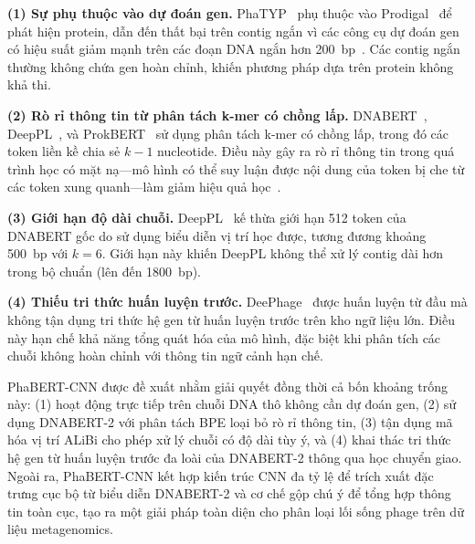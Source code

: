\textbf{(1) Sự phụ thuộc vào dự đoán gen.} PhaTYP~\cite{shang2023phatyp} phụ thuộc vào Prodigal~\cite{hyatt2010prodigal} để phát hiện protein, dẫn đến thất bại trên contig ngắn vì các công cụ dự đoán gen có hiệu suất giảm mạnh trên các đoạn DNA ngắn hơn 200~bp~\cite{trimble2012short}. Các contig ngắn thường không chứa gen hoàn chỉnh, khiến phương pháp dựa trên protein không khả thi.

\textbf{(2) Rò rỉ thông tin từ phân tách k-mer có chồng lấp.} DNABERT~\cite{ji2021dnabert}, DeepPL~\cite{zhang2024deeppl}, và ProkBERT~\cite{ligeti2024prokbert} sử dụng phân tách k-mer có chồng lấp, trong đó các token liền kề chia sẻ $k-1$ nucleotide. Điều này gây ra rò rỉ thông tin trong quá trình học có mặt nạ---mô hình có thể suy luận được nội dung của token bị che từ các token xung quanh---làm giảm hiệu quả học~\cite{zhou2023dnabert}.

\textbf{(3) Giới hạn độ dài chuỗi.} DeepPL~\cite{zhang2024deeppl} kế thừa giới hạn 512 token của DNABERT gốc do sử dụng biểu diễn vị trí học được, tương đương khoảng 500~bp với $k=6$. Giới hạn này khiến DeepPL không thể xử lý contig dài hơn trong bộ chuẩn (lên đến 1800~bp).

\textbf{(4) Thiếu tri thức huấn luyện trước.} DeePhage~\cite{wu2021deephage} được huấn luyện từ đầu mà không tận dụng tri thức hệ gen từ huấn luyện trước trên kho ngữ liệu lớn. Điều này hạn chế khả năng tổng quát hóa của mô hình, đặc biệt khi phân tích các chuỗi không hoàn chỉnh với thông tin ngữ cảnh hạn chế.

PhaBERT-CNN được đề xuất nhằm giải quyết đồng thời cả bốn khoảng trống này: (1) hoạt động trực tiếp trên chuỗi DNA thô không cần dự đoán gen, (2) sử dụng DNABERT-2 với phân tách BPE loại bỏ rò rỉ thông tin, (3) tận dụng mã hóa vị trí ALiBi cho phép xử lý chuỗi có độ dài tùy ý, và (4) khai thác tri thức hệ gen từ huấn luyện trước đa loài của DNABERT-2 thông qua học chuyển giao. Ngoài ra, PhaBERT-CNN kết hợp kiến trúc CNN đa tỷ lệ để trích xuất đặc trưng cục bộ từ biểu diễn DNABERT-2 và cơ chế gộp chú ý để tổng hợp thông tin toàn cục, tạo ra một giải pháp toàn diện cho phân loại lối sống phage trên dữ liệu metagenomics.


